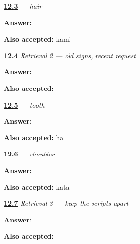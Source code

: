 \noindent\begin{minipage}[t]{\linewidth}
\raggedright
\hyperlink{review-JA-C12-kami-write}{\textbf{12.3}} \emph{ — hair}\par
\small \textbf{Answer:} \par
\footnotesize \textbf{Also accepted:} kami
\end{minipage}\par\medskip

\noindent\begin{minipage}[t]{\linewidth}
\raggedright
\hyperlink{review-JA-R12-foundation-02-card}{\textbf{12.4}} \emph{Retrieval 2 — old signs, recent request}\par
\small \textbf{Answer:} \par
\footnotesize \textbf{Also accepted:}      
\end{minipage}\par\medskip

\noindent\begin{minipage}[t]{\linewidth}
\raggedright
\hyperlink{review-JA-C12-ha-tooth-write}{\textbf{12.5}} \emph{ — tooth}\par
\small \textbf{Answer:} \par
\footnotesize \textbf{Also accepted:} ha
\end{minipage}\par\medskip

\noindent\begin{minipage}[t]{\linewidth}
\raggedright
\hyperlink{review-JA-C12-kata-write}{\textbf{12.6}} \emph{ — shoulder}\par
\small \textbf{Answer:} \par
\footnotesize \textbf{Also accepted:} kata
\end{minipage}\par\medskip

\noindent\begin{minipage}[t]{\linewidth}
\raggedright
\hyperlink{review-JA-R12-mixed-scripts-card}{\textbf{12.7}} \emph{Retrieval 3 — keep the scripts apart}\par
\small \textbf{Answer:} \par
\footnotesize \textbf{Also accepted:}     
\end{minipage}\par\medskip


